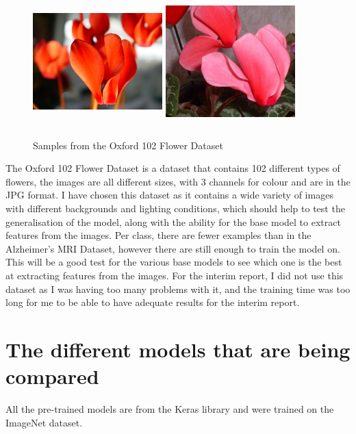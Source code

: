 \documentclass[]{final_report}
\begin{document}
\begin{figure}[ht!]
  \centering
  \includegraphics[width=50mm,height=50mm]{images/flower1.jpg}
  \includegraphics[width=50mm,height=50mm]{images/flower2.jpg}
  \caption{Samples from the Oxford 102 Flower Dataset\cite{OxfordFlowers102}}
\end{figure}

The Oxford 102 Flower Dataset is a dataset that contains 102 different types of flowers,
the images are all different sizes, with 3 channels for colour and are in the JPG format.
I have chosen this dataset as it contains a wide variety of images with different backgrounds and lighting conditions,
which should help to test the generalisation of the model, along with the ability for the base model to extract features from the images.
Per class, there are fewer examples than in the Alzheimer's MRI Dataset, however there are still enough to train the model on.
This will be a good test for the various base models to see which one is the best at extracting features from the images.
For the interim report, I did not use this dataset as I was having too many problems with it, and the training time
was too long for me to be able to have adequate results for the interim report.

\chapter{The different models that are being compared}

All the pre-trained models are from the Keras library\cite{Keras} and were trained on the ImageNet dataset\cite{ImageNet}.
\end{document}
